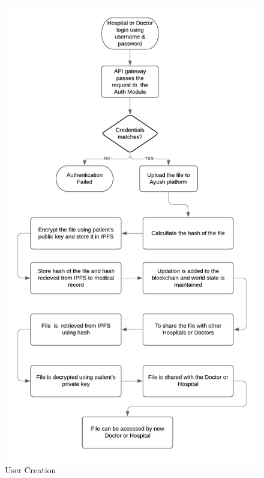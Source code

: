 \documentclass[11pt]{report}
\begin{document}
    \begin{figure}[h!]
        \centering
        \includegraphics[scale=0.8]{F1.png}
        \caption{User Creation}
        \label{fig:my_label}
    \end{figure}
    
\end{document}
